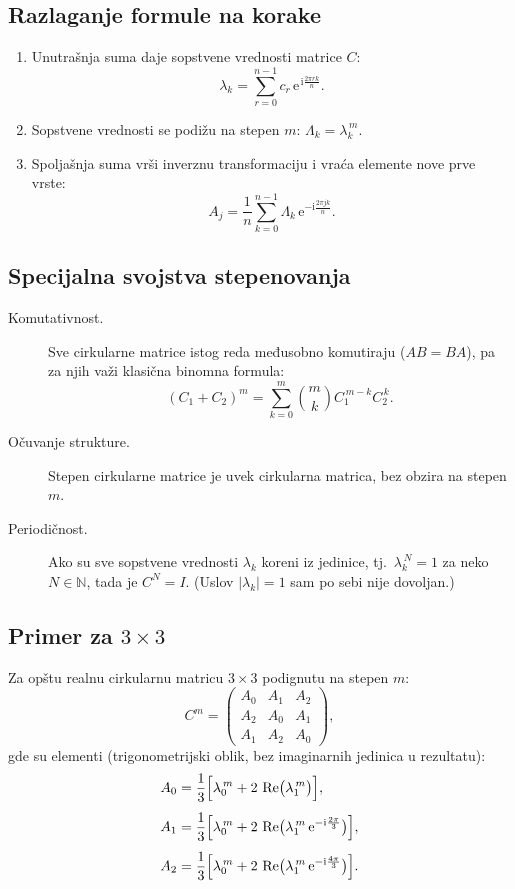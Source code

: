 \documentclass[12pt,a4paper]{report}
\newcommand{\I}{\mathrm{i}}
\newcommand{\E}{\mathrm{e}}
\renewcommand{\Re}{\operatorname{Re}}
\begin{document}
\subsection{Razlaganje formule na korake}
\begin{enumerate}
	\item Unutrašnja suma daje sopstvene vrednosti matrice $C$:
	\[
	\lambda_k = \sum_{r=0}^{n-1} c_r\, \E^{\,\I \frac{2\pi r k}{n}} .
	\]
	\item Sopstvene vrednosti se podižu na stepen $m$: $\Lambda_k = \lambda_k^{\,m}$.
	\item Spoljašnja suma vrši inverznu transformaciju i vraća elemente nove
	prve vrste:
	\[
	A_j = \frac{1}{n} \sum_{k=0}^{n-1} \Lambda_k\, \E^{-\I \frac{2\pi j k}{n}} .
	\]
\end{enumerate}

\subsection{Specijalna svojstva stepenovanja}

\begin{description}
	\item[Komutativnost.] Sve cirkularne matrice istog reda međusobno komutiraju
	($AB = BA$), pa za njih važi klasična binomna formula:
	\[
	(C_1 + C_2)^m = \sum_{k=0}^{m} \binom{m}{k} C_1^{\,m-k} C_2^{\,k} .
	\]
	\item[Očuvanje strukture.] Stepen cirkularne matrice je uvek cirkularna
	matrica, bez obzira na stepen $m$.
	\item[Periodičnost.] Ako su sve sopstvene vrednosti $\lambda_k$ koreni iz
	jedinice, tj.\ $\lambda_k^{\,N} = 1$ za neko $N \in \mathbb{N}$, tada je
	$C^N = I$. (Uslov $|\lambda_k| = 1$ sam po sebi nije dovoljan.)
\end{description}

\subsection{Primer za $3 \times 3$}

Za opštu realnu cirkularnu matricu $3 \times 3$ podignutu na stepen $m$:
\[
C^m =
\begin{pmatrix}
	A_0 & A_1 & A_2 \\
	A_2 & A_0 & A_1 \\
	A_1 & A_2 & A_0
\end{pmatrix},
\]
gde su elementi (trigonometrijski oblik, bez imaginarnih jedinica u rezultatu):
\begin{align*}
	A_0 &= \frac{1}{3}\Bigl[\lambda_0^{\,m} + 2\,\Re\bigl(\lambda_1^{\,m}\bigr)\Bigr], \\[4pt]
	A_1 &= \frac{1}{3}\Bigl[\lambda_0^{\,m} + 2\,\Re\bigl(\lambda_1^{\,m}\, \E^{-\I \frac{2\pi}{3}}\bigr)\Bigr], \\[4pt]
	A_2 &= \frac{1}{3}\Bigl[\lambda_0^{\,m} + 2\,\Re\bigl(\lambda_1^{\,m}\, \E^{-\I \frac{4\pi}{3}}\bigr)\Bigr].
\end{align*}
\end{document}
